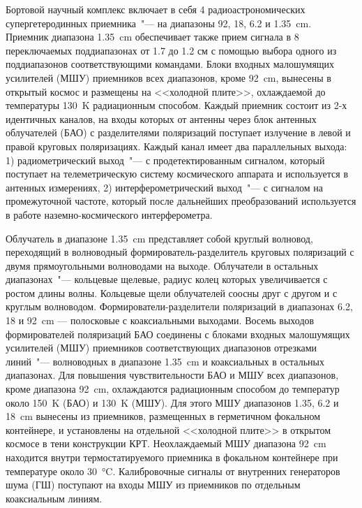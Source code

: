Бортовой научный комплекс включает в себя 4 радиоастрономических супергетеродинных приемника~"--- на
диапазоны 92, 18, 6.2 и \SI{1.35}{\cm}. Приемник диапазона \SI{1.35}{\cm} обеспечивает также прием
сигнала в 8 переключаемых поддиапазонах от 1.7 до 1.2 см с помощью выбора одного из поддиапазонов
соответствующими командами. Блоки входных малошумящих усилителей (МШУ) приемников всех диапазонов,
кроме \SI{92}{\cm}, вынесены в открытый космос и размещены на <<холодной плите>>, охлаждаемой до
температуры \SI{130}{\kelvin} радиационным способом. Каждый приемник состоит из 2-х идентичных
каналов, на входы которых от антенны через блок антенных облучателей (БАО) с разделителями
поляризаций поступает излучение в левой и правой круговых поляризациях. Каждый канал имеет два
параллельных выхода: 1) радиометрический выход~"--- с продетектированным сигналом, который поступает
на телеметрическую систему космического аппарата и используется в антенных измерениях, 2)
интерферометрический выход~"--- с сигналом на промежуточной частоте, который после дальнейших
преобразований используется в работе наземно-космического интерферометра.

Облучатель в диапазоне \SI{1.35}{\cm} представляет собой круглый волновод, переходящий в волноводный
формирователь-разделитель круговых поляризаций с двумя прямоугольными волноводами на выходе.
Облучатели в остальных диапазонах~"--- кольцевые щелевые, радиус колец которых увеличивается с
ростом
длины волны. Кольцевые щели облучателей соосны друг с другом и с круглым волноводом.
Формирователи-разделители поляризаций в диапазонах 6.2, 18 и \SI{92}{\cm} --- полосковые с
коаксиальными выходами. Восемь выходов формирователей поляризаций БАО соединены с блоками входных
малошумящих усилителей (МШУ) приемников соответствующих диапазонов отрезками линий~"--- волноводных
в
диапазоне \SI{1.35}{\cm} и коаксиальных в остальных диапазонах. Для повышения чувствительности БАО и
МШУ всех диапазонов, кроме диапазона \SI{92}{\cm}, охлаждаются радиационным способом до температур
около \SI{150}{\kelvin} (БАО) и \SI{130}{\kelvin} (МШУ). Для этого МШУ диапазонов 1.35, 6.2 и
\SI{18}{\cm} вынесены из приемников, размещенных в герметичном фокальном контейнере, и установлены
на отдельной <<холодной плите>> в открытом космосе в тени конструкции КРТ. Неохлаждаемый МШУ
диапазона \SI{92}{\cm} находится внутри термостатируемого приемника в фокальном контейнере при
температуре около \SI{30}{\degreeCelsius}. Калибровочные сигналы от внутренних генераторов шума (ГШ)
поступают на входы МШУ из приемников по отдельным коаксиальным линиям.

